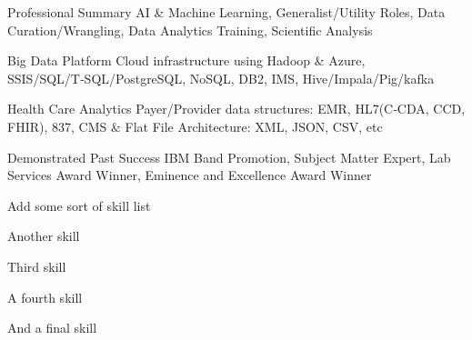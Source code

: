 

\begin{cvskills}

  \cvskill
    {Professional Summary} %
    {AI \& Machine Learning, Generalist/Utility Roles, Data Curation/Wrangling, Data Analytics Training, Scientific Analysis} %

  \cvskill
    {Big Data Platform} %
    {Cloud infrastructure using Hadoop \& Azure, SSIS/SQL/T‑SQL/PostgreSQL, NoSQL, DB2, IMS, Hive/Impala/Pig/kafka} %

  \cvskill
    {Health Care Analytics} %
    {Payer/Provider data structures: EMR, HL7(C‑CDA, CCD, FHIR), 837, CMS \& Flat File Architecture: XML, JSON, CSV, etc} %

  \cvskill
    {Demonstrated Past Success} %
    {IBM Band Promotion, Subject Matter Expert, Lab Services Award Winner, Eminence and Excellence Award Winner} %

\end{cvskills}


\begin{cvcenterlist}
  \item {Add some sort of skill list}
  \item {Another skill}
  \item {Third skill}
  \item {A fourth skill}
  \item {And a final skill}
\end{cvcenterlist}


